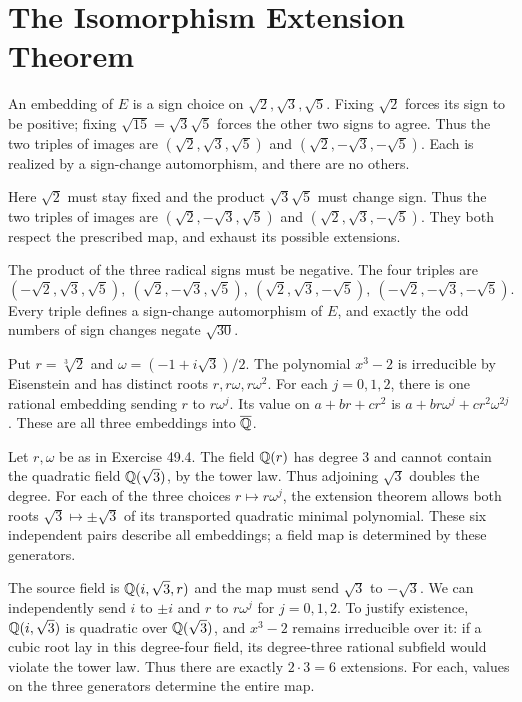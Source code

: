 \section{The Isomorphism Extension Theorem}

An embedding of $E$ is a sign choice on $\sqrt2,\sqrt3,\sqrt5$. Fixing $\sqrt2$ forces its sign to be positive; fixing $\sqrt{15}=\sqrt3\sqrt5$ forces the other two signs to agree. Thus the two triples of images are $(\sqrt2,\sqrt3,\sqrt5)$ and $(\sqrt2,-\sqrt3,-\sqrt5)$. Each is realized by a sign-change automorphism, and there are no others.

Here $\sqrt2$ must stay fixed and the product $\sqrt3\sqrt5$ must change sign. Thus the two triples of images are $(\sqrt2,-\sqrt3,\sqrt5)$ and $(\sqrt2,\sqrt3,-\sqrt5)$. They both respect the prescribed map, and exhaust its possible extensions.

The product of the three radical signs must be negative. The four triples are
\[(-\sqrt2,\sqrt3,\sqrt5),\ (\sqrt2,-\sqrt3,\sqrt5),\ (\sqrt2,\sqrt3,-\sqrt5),\ (-\sqrt2,-\sqrt3,-\sqrt5).\]
Every triple defines a sign-change automorphism of $E$, and exactly the odd numbers of sign changes negate $\sqrt{30}$.

Put $r=\sqrt[3]2$ and $\omega=(-1+i\sqrt3)/2$. The polynomial $x^3-2$ is irreducible by Eisenstein and has distinct roots $r,r\omega,r\omega^2$. For each $j=0,1,2$, there is one rational embedding sending $r$ to $r\omega^j$. Its value on $a+br+cr^2$ is $a+br\omega^j+cr^2\omega^{2j}$. These are all three embeddings into $\overline{\mathbb{Q}}$.

Let $r,\omega$ be as in Exercise 49.4. The field $\mathbb{Q}(r)$ has degree 3 and cannot contain the quadratic field $\mathbb{Q}(\sqrt3)$, by the tower law. Thus adjoining $\sqrt3$ doubles the degree. For each of the three choices $r\mapsto r\omega^j$, the extension theorem allows both roots $\sqrt3\mapsto\pm\sqrt3$ of its transported quadratic minimal polynomial. These six independent pairs describe all embeddings; a field map is determined by these generators.

The source field is $\mathbb{Q}(i,\sqrt3,r)$ and the map must send $\sqrt3$ to $-\sqrt3$. We can independently send $i$ to $\pm i$ and $r$ to $r\omega^j$ for $j=0,1,2$. To justify existence, $\mathbb{Q}(i,\sqrt3)$ is quadratic over $\mathbb{Q}(\sqrt3)$, and $x^3-2$ remains irreducible over it: if a cubic root lay in this degree-four field, its degree-three rational subfield would violate the tower law. Thus there are exactly $2\cdot3=6$ extensions. For each, values on the three generators determine the entire map.

